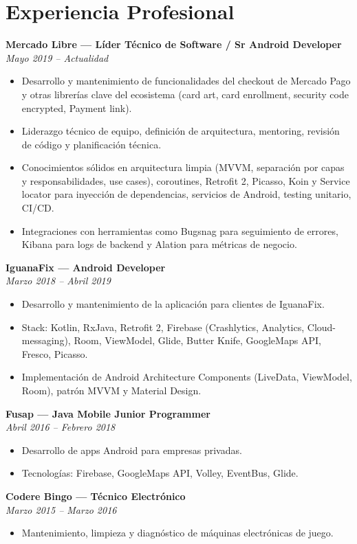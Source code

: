 \documentclass[11pt,a4paper]{article}
\newcommand{\jobtitle}[2]{
    \noindent\textbf{#1}\\
    \textit{#2}\par\vspace{0.5em}
}
\begin{document}
\section{Experiencia Profesional}

\jobtitle{Mercado Libre — Líder Técnico de Software / Sr Android Developer}{Mayo 2019 – Actualidad}
\begin{itemize}[leftmargin=*]
    \item Desarrollo y mantenimiento de funcionalidades del checkout de Mercado Pago y otras librerías clave del ecosistema (card art, card enrollment, security code encrypted, Payment link).
    \item Liderazgo técnico de equipo, definición de arquitectura, mentoring, revisión de código y planificación técnica.
    \item Conocimientos sólidos en arquitectura limpia (MVVM, separación por capas y responsabilidades, use cases), coroutines, Retrofit 2, Picasso, Koin y Service locator para inyección de dependencias, servicios de Android, testing unitario, CI/CD.
    \item Integraciones con herramientas como Bugsnag para seguimiento de errores, Kibana para logs de backend y Alation para métricas de negocio.
\end{itemize}

\jobtitle{IguanaFix — Android Developer}{Marzo 2018 – Abril 2019}
\begin{itemize}[leftmargin=*]
    \item Desarrollo y mantenimiento de la aplicación para clientes de IguanaFix.
    \item Stack: Kotlin, RxJava, Retrofit 2, Firebase (Crashlytics, Analytics, Cloud-messaging), Room, ViewModel, Glide, Butter Knife, GoogleMaps API, Fresco, Picasso.
    \item Implementación de Android Architecture Components (LiveData, ViewModel, Room), patrón MVVM y Material Design.
\end{itemize}

\jobtitle{Fusap — Java Mobile Junior Programmer}{Abril 2016 – Febrero 2018}
\begin{itemize}[leftmargin=*]
    \item Desarrollo de apps Android para empresas privadas.
    \item Tecnologías: Firebase, GoogleMaps API, Volley, EventBus, Glide.
\end{itemize}

\jobtitle{Codere Bingo — Técnico Electrónico}{Marzo 2015 – Marzo 2016}
\begin{itemize}[leftmargin=*]
    \item Mantenimiento, limpieza y diagnóstico de máquinas electrónicas de juego.
\end{itemize}
\end{document}
